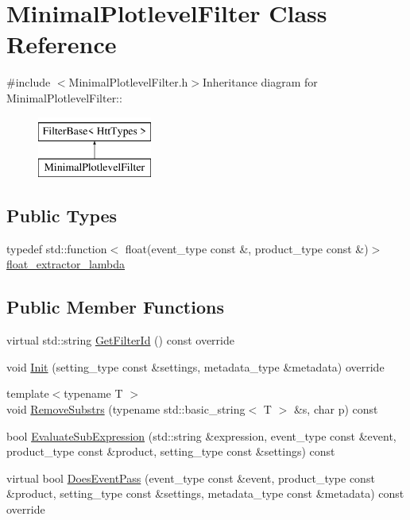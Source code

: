 \hypertarget{classMinimalPlotlevelFilter}{
\section{MinimalPlotlevelFilter Class Reference}
\label{classMinimalPlotlevelFilter}
}


{\ttfamily \#include $<$MinimalPlotlevelFilter.h$>$}Inheritance diagram for MinimalPlotlevelFilter::\begin{figure}[H]
\begin{center}
\leavevmode
\includegraphics[height=2cm]{classMinimalPlotlevelFilter}
\end{center}
\end{figure}
\subsection*{Public Types}
\begin{DoxyCompactItemize}
\item 
typedef std::function$<$ float(event\_\-type const \&, product\_\-type const \&)$>$ \hyperlink{classMinimalPlotlevelFilter_aa163bb0b63ea3977ac16ae1d93c212da}{float\_\-extractor\_\-lambda}
\end{DoxyCompactItemize}
\subsection*{Public Member Functions}
\begin{DoxyCompactItemize}
\item 
virtual std::string \hyperlink{classMinimalPlotlevelFilter_a7441333289fdb10e98e4b90bec49fe7c}{GetFilterId} () const override
\item 
void \hyperlink{classMinimalPlotlevelFilter_aaefe1a2b934ecae86dadad1d99b36e26}{Init} (setting\_\-type const \&settings, metadata\_\-type \&metadata) override
\item 
{\footnotesize template$<$typename T $>$ }\\void \hyperlink{classMinimalPlotlevelFilter_a684d038fb986d2dd9a52e24fe0a4c695}{RemoveSubstrs} (typename std::basic\_\-string$<$ T $>$ \&s, char p) const 
\item 
bool \hyperlink{classMinimalPlotlevelFilter_afbc57cd2c1cf01f677370e059d37a05b}{EvaluateSubExpression} (std::string \&expression, event\_\-type const \&event, product\_\-type const \&product, setting\_\-type const \&settings) const 
\item 
virtual bool \hyperlink{classMinimalPlotlevelFilter_af6f815df35d7ee526a860be377834363}{DoesEventPass} (event\_\-type const \&event, product\_\-type const \&product, setting\_\-type const \&settings, metadata\_\-type const \&metadata) const override
\end{DoxyCompactItemize}


